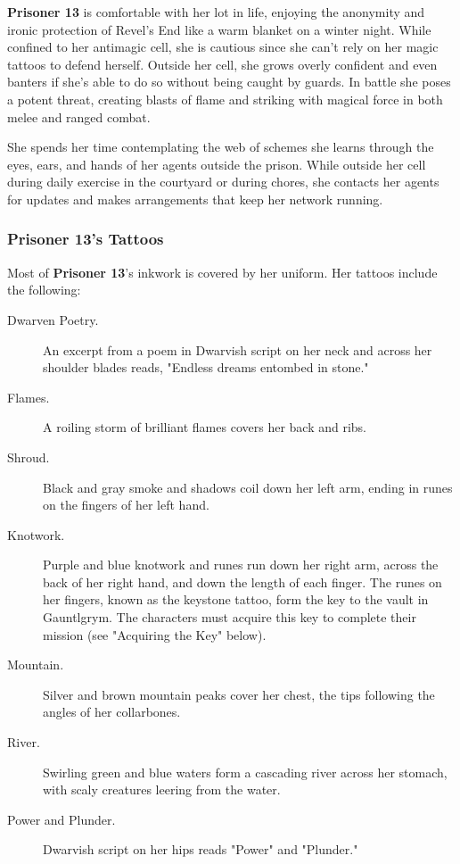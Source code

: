 \documentclass[10pt,a4paper,twoside,bg=print,twocolumn,openany,nodeprecatedcode]{dndbook}
\begin{document}
\textbf{Prisoner 13} is comfortable with her lot in life, enjoying the anonymity and ironic protection of Revel's End like a warm blanket on a winter night. While confined to her antimagic cell, she is cautious since she can't rely on her magic tattoos to defend herself. Outside her cell, she grows overly confident and even banters if she's able to do so without being caught by guards. In battle she poses a potent threat, creating blasts of flame and striking with magical force in both melee and ranged combat.

She spends her time contemplating the web of schemes she learns through the eyes, ears, and hands of her agents outside the prison. While outside her cell during daily exercise in the courtyard or during chores, she contacts her agents for updates and makes arrangements that keep her network running.

\subsubsection{Prisoner 13's Tattoos}
Most of \textbf{Prisoner 13}'s inkwork is covered by her uniform. Her tattoos include the following:


\begin{description}
\item[Dwarven Poetry.]
An excerpt from a poem in Dwarvish script on her neck and across her shoulder blades reads, "Endless dreams entombed in stone."
\item[Flames.]
A roiling storm of brilliant flames covers her back and ribs.
\item[Shroud.]
Black and gray smoke and shadows coil down her left arm, ending in runes on the fingers of her left hand.
\item[Knotwork.]
Purple and blue knotwork and runes run down her right arm, across the back of her right hand, and down the length of each finger. The runes on her fingers, known as the keystone tattoo, form the key to the vault in Gauntlgrym. The characters must acquire this key to complete their mission (see "Acquiring the Key" below).
\item[Mountain.]
Silver and brown mountain peaks cover her chest, the tips following the angles of her collarbones.
\item[River.]
Swirling green and blue waters form a cascading river across her stomach, with scaly creatures leering from the water.
\item[Power and Plunder.]
Dwarvish script on her hips reads "Power" and "Plunder."
\end{description}
\end{document}
